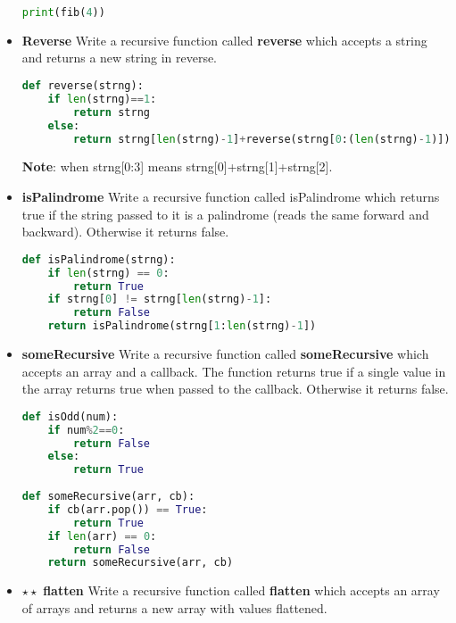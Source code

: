 \documentclass[10pt,letterpaper]{article}
\begin{document}
\begin{itemize}
\begin{lstlisting}[language=Python, caption=Solution for fib]
print(fib(4))
\end{lstlisting}

\item \textbf{Reverse} Write a recursive function called \textbf{reverse} which accepts a string and returns a new string in reverse.
\begin{lstlisting}[language=Python, caption=Solution for Reverse]
def reverse(strng):
    if len(strng)==1:
        return strng
    else:
        return strng[len(strng)-1]+reverse(strng[0:(len(strng)-1)])
\end{lstlisting}
\textbf{Note}: when strng[0:3] means strng[0]+strng[1]+strng[2].

\item \textbf{isPalindrome} Write a recursive function called isPalindrome which returns true if the string passed to it is a palindrome (reads the same forward and backward). Otherwise it returns false.
\begin{lstlisting}[language=Python, caption=Solution for isPalindrome]
def isPalindrome(strng):
    if len(strng) == 0:
        return True
    if strng[0] != strng[len(strng)-1]:
        return False
    return isPalindrome(strng[1:len(strng)-1])
\end{lstlisting}

\item \textbf{someRecursive} Write a recursive function called \textbf{someRecursive} which accepts an array and a callback. The function returns true if a single value in the array returns true when passed to the callback. Otherwise it returns false.
\begin{lstlisting}[language=Python, caption=Solving for someRecursive]
def isOdd(num):
    if num%2==0:
        return False
    else:
        return True
        
def someRecursive(arr, cb):
    if cb(arr.pop()) == True:
        return True
    if len(arr) == 0:
        return False
    return someRecursive(arr, cb)
\end{lstlisting}

\item $\star\star$ \textbf{flatten} Write a recursive function called \textbf{flatten} which accepts an array of arrays and returns a new array with values flattened. \\


\end{itemize}
\end{document}
